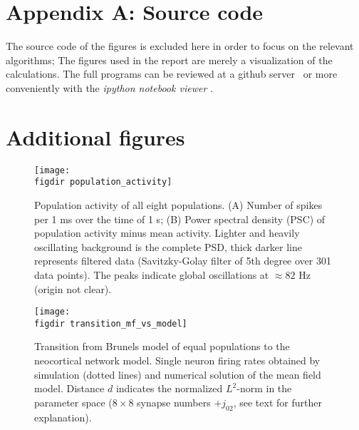 \section{Appendix A: Source code}
The source code of the figures is excluded here in order to focus on the relevant algorithms; 
The figures used in the report are merely a visualization of the calculations. The full programs can
be reviewed at a github server~\cite{ba_github} or more conveniently with the \textit{ipython notebook viewer} 
\cite{notebook_viewer}.

\section{Additional figures}
\begin{figure}[htpb]
    \centering
    \texttt{[image: \\figdir population\_activity]}
    \caption{Population activity of all eight populations.
        (A) Number of spikes per 1 ms over the time of 1 s;
        (B) Power spectral density (PSC) of population activity minus mean activity. 
        Lighter and heavily oscillating background is the complete PSD, thick darker 
        line represents filtered data (Savitzky-Golay filter of 5th degree over 301 data points).
        The peaks indicate global oscillations at $\approx 82$ Hz (origin not clear).
    }
    \label{fig:population_activity}
\end{figure}

\begin{figure}[htpb]
    \centering
    \texttt{[image: \\figdir transition\_mf\_vs\_model]}
    \caption{Transition from Brunels model of equal populations to the neocortical network model. 
        Single neuron firing rates obtained by simulation (dotted lines) and 
        numerical solution of the mean field model. Distance $d$ indicates the 
        normalized $L^2$-norm in the parameter space ($8 \times 8$ synapse numbers $+ j_{02}$, see text
        for further explanation). 
    }
    \label{fig:transition_mf_vs_model}
\end{figure}


